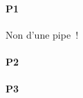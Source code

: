 \paragraph{P1}
\lipsum[1]
Non d'une pipe~\cite{bartel2012dexpler}!

\paragraph{P2} 
\lipsum[2]

\paragraph{P3}
\lipsum[3]

